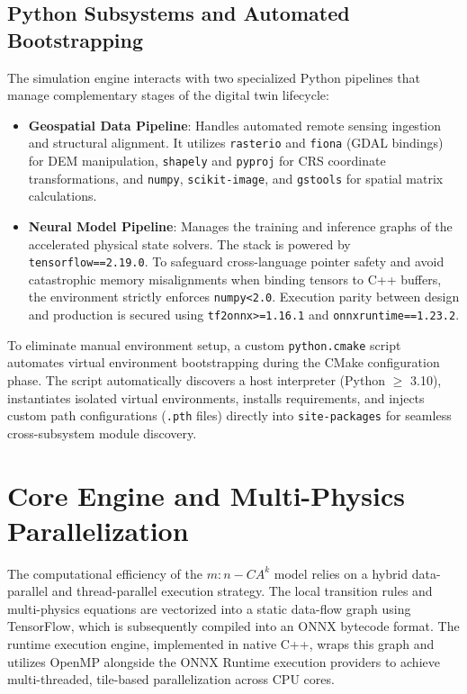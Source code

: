 \subsection{Python Subsystems and Automated Bootstrapping}

The simulation engine interacts with two specialized Python pipelines that manage complementary stages of the digital twin lifecycle:
\begin{itemize}
    \item \textbf{Geospatial Data Pipeline}: Handles automated remote sensing ingestion and structural alignment. It utilizes \texttt{rasterio} and \texttt{fiona} (GDAL bindings) for DEM manipulation, \texttt{shapely} and \texttt{pyproj} for CRS coordinate transformations, and \texttt{numpy}, \texttt{scikit-image}, and \texttt{gstools} for spatial matrix calculations.
    \item \textbf{Neural Model Pipeline}: Manages the training and inference graphs of the accelerated physical state solvers. The stack is powered by \texttt{tensorflow==2.19.0}. To safeguard cross-language pointer safety and avoid catastrophic memory misalignments when binding tensors to C++ buffers, the environment strictly enforces \texttt{numpy<2.0}. Execution parity between design and production is secured using \texttt{tf2onnx>=1.16.1} and \texttt{onnxruntime==1.23.2}.
\end{itemize}

To eliminate manual environment setup, a custom \texttt{python.cmake} script automates virtual environment bootstrapping during the CMake configuration phase. The script automatically discovers a host interpreter (Python $\ge$ 3.10), instantiates isolated virtual environments, installs requirements, and injects custom path configurations (\texttt{.pth} files) directly into \texttt{site-packages} for seamless cross-subsystem module discovery.


\section{Core Engine and Multi-Physics Parallelization}

The computational efficiency of the $m:n-CA^k$ model relies on a hybrid data-parallel and thread-parallel execution strategy. The local 
transition rules and multi-physics equations are vectorized into a static data-flow graph using TensorFlow, which is subsequently compiled 
into an ONNX bytecode format. The runtime execution engine, implemented in native C++, wraps this graph and utilizes OpenMP alongside the 
ONNX Runtime execution providers to achieve multi-threaded, tile-based parallelization across CPU cores.

